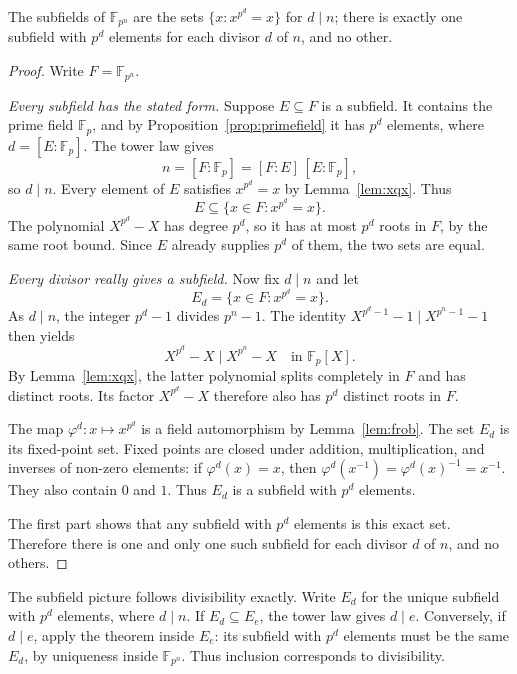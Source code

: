 \begin{theorem}\label{thm:subfields}
The subfields of $\mathbb F_{p^n}$ are the sets $\{x:x^{p^d}=x\}$ for $d\mid n$; there is exactly one subfield with $p^d$ elements for each divisor $d$ of $n$, and no other.
\end{theorem}
\begin{proof}
Write $F=\mathbb F_{p^n}$.

\emph{Every subfield has the stated form.}
Suppose $E\subseteq F$ is a subfield.
It contains the prime field $\mathbb F_p$,
and by Proposition~\ref{prop:primefield}
it has $p^d$ elements, where
$d=[E:\mathbb F_p]$.
The tower law gives
\[
n=[F:\mathbb F_p]=[F:E]\,[E:\mathbb F_p],
\]
so $d\mid n$. Every element of $E$
satisfies $x^{p^d}=x$
by Lemma~\ref{lem:xqx}. Thus
\[
E\subseteq\{x\in F:x^{p^d}=x\}.
\]
The polynomial $X^{p^d}-X$ has
degree $p^d$, so it has at most
$p^d$ roots in $F$, by the same root bound. Since $E$
already supplies $p^d$ of them,
the two sets are equal.

\emph{Every divisor really gives a subfield.}
Now fix $d\mid n$ and let
\[
E_d=\{x\in F:x^{p^d}=x\}.
\]
As $d\mid n$, the integer
$p^d-1$ divides $p^n-1$.
The identity
$X^{p^d-1}-1\mid X^{p^n-1}-1$
then yields
\[
X^{p^d}-X\mid X^{p^n}-X
\quad\text{in }\mathbb F_p[X].
\]
By Lemma~\ref{lem:xqx}, the latter
polynomial splits completely in $F$
and has distinct roots.
Its factor $X^{p^d}-X$ therefore
also has $p^d$ distinct roots in $F$.

The map $\varphi^d:x\mapsto x^{p^d}$
is a field automorphism by Lemma~\ref{lem:frob}.
The set $E_d$ is its fixed-point set.
Fixed points are closed under addition,
multiplication, and inverses of
non-zero elements:
if $\varphi^d(x)=x$, then
$\varphi^d(x^{-1})=\varphi^d(x)^{-1}=x^{-1}$.
They also contain $0$ and $1$.
Thus $E_d$ is a subfield with
$p^d$ elements.

The first part shows that any
subfield with $p^d$ elements is
this exact set. Therefore there is
one and only one such subfield
for each divisor $d$ of $n$,
and no others.
\end{proof}

The subfield picture follows divisibility exactly. Write $E_d$ for the
unique subfield with $p^d$ elements, where $d\mid n$. If $E_d\subseteq E_e$,
the tower law gives $d\mid e$. Conversely, if $d\mid e$, apply the theorem
inside $E_e$: its subfield with $p^d$ elements must be the same $E_d$,
by uniqueness inside $\mathbb F_{p^n}$. Thus inclusion corresponds to
divisibility.

